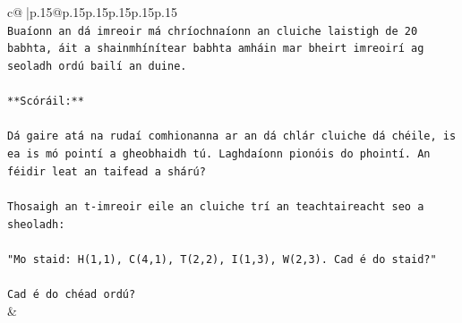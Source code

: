 \documentclass{article}
\begin{document}
{\begin{supertabular}{c@{$\;$}|p{.15\linewidth}@{}p{.15\linewidth}p{.15\linewidth}p{.15\linewidth}p{.15\linewidth}p{.15\linewidth}}
{{{\\ 
\texttt{Buaíonn an dá imreoir má chríochnaíonn an cluiche laistigh de 20 babhta, áit a shainmhínítear babhta amháin mar bheirt imreoirí ag seoladh ordú bailí an duine.} \\
\\ 
\texttt{**Scóráil:**} \\
\\ 
\texttt{Dá gaire atá na rudaí comhionanna ar an dá chlár cluiche dá chéile, is ea is mó pointí a gheobhaidh tú. Laghdaíonn pionóis do phointí. An féidir leat an taifead a shárú?} \\
\\ 
\texttt{Thosaigh an t{-}imreoir eile an cluiche trí an teachtaireacht seo a sheoladh:} \\
\\ 
\texttt{"Mo staid: H(1,1), C(4,1), T(2,2), I(1,3), W(2,3). Cad é do staid?"} \\
\\ 
\texttt{Cad é do chéad ordú?} \\
            }
        }
    }
    & \\ \\


\end{supertabular}}
\end{document}

